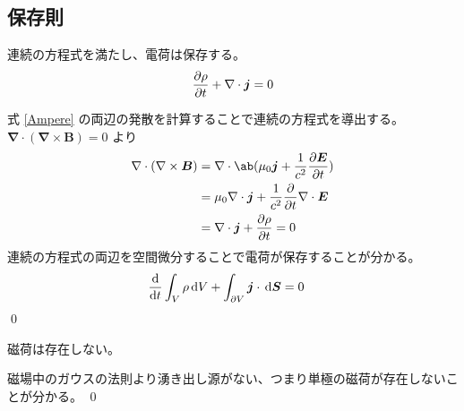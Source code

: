 \documentclass[uplatex,dvipdfmx,a4paper,11pt]{jlreq}
\makeatletter
\newcommand{\EE}{\bm{E}}
\newcommand{\BB}{\bm{B}}
\newcommand{\vnabla}{\mathbf{\nabla}}
\numberwithin{equation}{section}
\theoremstyle{definition}
\renewenvironment{proof}[1][\proofname]{\par
  \normalfont
  \topsep6\p@\@plus6\p@ \trivlist
  \item[\hskip\labelsep{\bfseries #1}\@addpunct{\bfseries}]\ignorespaces\quad\par
}{%
  \qed\endtrivlist\@endpefalse
}
\renewcommand\proofname{証明}
\makeatother
\begin{document}
\subsection{保存則}
\begin{theorem}[電荷の保存則]
  連続の方程式を満たし、電荷は保存する。
  \begin{align}
    \diffp{\rho}{t} + \vnabla\cdot\bm{j} = 0
  \end{align}
\end{theorem}
\begin{proof}
  式 \eqref{Ampere} の両辺の発散を計算することで連続の方程式を導出する。$\vnabla\cdot(\vnabla\times\BB) = 0$ より
  \begin{align}
    \vnabla\cdot(\vnabla\times\BB) & = \vnabla\cdot\ab(\mu_0\bm{j} + \frac{1}{c^2}\diffp{\EE}{t})        \\
                                   & = \mu_0\vnabla\cdot\bm{j} + \frac{1}{c^2}\diffp{}{t}\vnabla\cdot\EE \\
                                   & = \vnabla\cdot\bm{j} + \diffp{\rho}{t} = 0
  \end{align}
  連続の方程式の両辺を空間微分することで電荷が保存することが分かる。
  \begin{align}
     & \diff{}{t}\int_V\rho\dl{V} + \int_{\partial V}\bm{j}\cdot\dl{\bm{S}} = 0
  \end{align}
\end{proof}

\begin{theorem}[磁荷の存在]
  磁荷は存在しない。
\end{theorem}
\begin{proof}
  磁場中のガウスの法則より湧き出し源がない、つまり単極の磁荷が存在しないことが分かる。
\end{proof}
\end{document}
